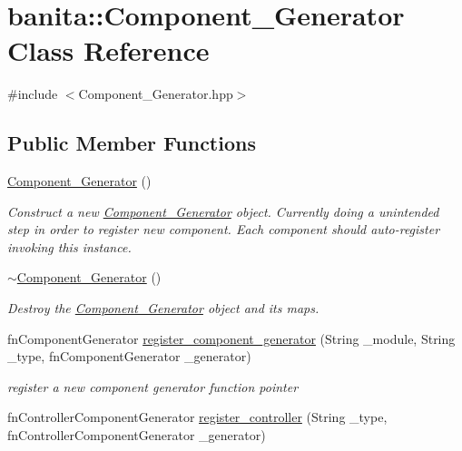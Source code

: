 \hypertarget{classbanita_1_1_component___generator}{}\section{banita\+::Component\+\_\+\+Generator Class Reference}
\label{classbanita_1_1_component___generator}


{\ttfamily \#include $<$Component\+\_\+\+Generator.\+hpp$>$}

\subsection*{Public Member Functions}
\begin{DoxyCompactItemize}
\item 
\mbox{\hyperlink{classbanita_1_1_component___generator_a2eeb40bd9675d0c1828de601324c503d}{Component\+\_\+\+Generator}} ()
\begin{DoxyCompactList}\small\item\em Construct a new \mbox{\hyperlink{classbanita_1_1_component___generator}{Component\+\_\+\+Generator}} object. Currently doing a unintended step in order to register new component. Each component should auto-\/register invoking this instance. \end{DoxyCompactList}\item 
\mbox{\hyperlink{classbanita_1_1_component___generator_a7d43e1dbee3a0addf85bd96422bef52d}{$\sim$\+Component\+\_\+\+Generator}} ()
\begin{DoxyCompactList}\small\item\em Destroy the \mbox{\hyperlink{classbanita_1_1_component___generator}{Component\+\_\+\+Generator}} object and it\textquotesingle{}s maps. \end{DoxyCompactList}\item 
fn\+Component\+Generator \mbox{\hyperlink{classbanita_1_1_component___generator_a6c94801a7c5c3eb6aedc0c97bf786b39}{register\+\_\+component\+\_\+generator}} (String \+\_\+module, String \+\_\+type, fn\+Component\+Generator \+\_\+generator)
\begin{DoxyCompactList}\small\item\em register a new component generator function pointer \end{DoxyCompactList}\item 
fn\+Controller\+Component\+Generator \mbox{\hyperlink{classbanita_1_1_component___generator_af81270da5efa804c17285d1a6ffc861f}{register\+\_\+controller}} (String \+\_\+type, fn\+Controller\+Component\+Generator \+\_\+generator)

\end{DoxyCompactItemize}
